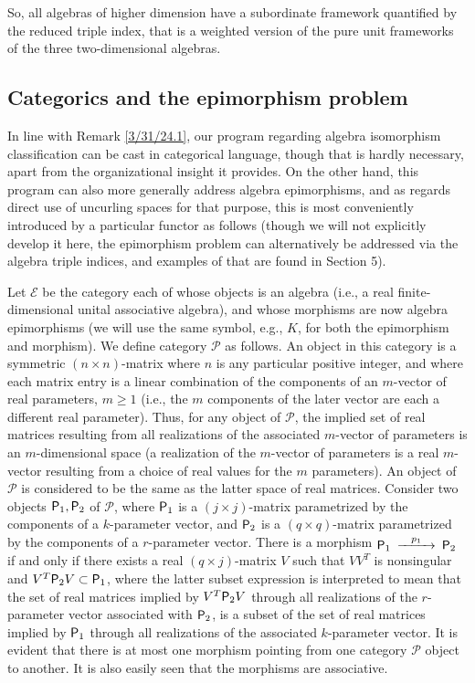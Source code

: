 \documentclass{amsart}
\numberwithin{equation}{section}
\theoremstyle{definition}
\numberwithin{theorem}{section}
\begin{document}
 So, all algebras of higher dimension have a subordinate framework quantified by the reduced triple index, that is a weighted version of the pure unit frameworks of the three two-dimensional algebras.

\subsection{Categorics and the epimorphism problem}
 In line with Remark \ref{3/31/24.1}, our program regarding algebra isomorphism classification can be cast in categorical language, though that is hardly necessary, apart from the organizational insight it provides. 
On the other hand, this program can also more generally address algebra epimorphisms, and as regards direct use of uncurling spaces for that purpose, this is most conveniently introduced by a particular functor as follows (though we will not explicitly develop it here, the epimorphism problem can alternatively be addressed via the algebra triple indices, and examples of that are found in Section 5).  

Let $\mathcal{E}$ be the category each of whose objects is an algebra (i.e., a real finite-dimensional unital associative algebra), and whose morphisms are now algebra epimorphisms (we will use the same symbol, e.g., $K$, for both the epimorphism and morphism).  We define category $\mathcal{P}$ as follows. An object in this category is a symmetric $(n\times n)$-matrix where $n$ is any particular positive integer, and where each matrix entry is a linear combination of the components of an $m$-vector of real parameters, $m\ge 1$ (i.e., the $m$ components of the later vector are each a different real parameter).  Thus, for any object of $\mathcal{P}$, the implied set of real matrices resulting from all realizations of the associated $m$-vector of parameters is an $m$-dimensional space (a realization of the $m$-vector of parameters is a real $m$-vector resulting from a choice of real values for the $m$ parameters).  An object of $\mathcal{P}$ is considered to be the same as the latter space of real matrices.  Consider two objects ${\sf P}_1,{\sf P}_2$ of $\mathcal{P}$, where ${\sf P}_1$ is a $(j\times j)$-matrix parametrized by the components of a $k$-parameter vector, and ${\sf P}_2$ is a $(q\times q)$-matrix parametrized by the components of a $r$-parameter vector.  There is a morphism $ \begin{CD}  {\sf P}_1 @>p_1>> {\sf P}_2\end{CD}$ if and only if  there exists a real $(q\times j)$-matrix $V$ such that $VV^T$ is nonsingular and $V^T{\sf P}_2V\subset {\sf P}_1$, where the latter subset expression is 
interpreted to mean that the set of real matrices implied by $V^T{\sf P}_2V$ through all realizations of the $r$-parameter vector associated with ${\sf P}_2$, is a subset of  the set of real matrices implied by  ${\sf P}_1$ through all realizations of the associated $k$-parameter vector.  It is evident that there is at most one morphism pointing from one category $\mathcal{P}$ object to another.  It is also easily seen that the morphisms are associative.  
\end{document}

